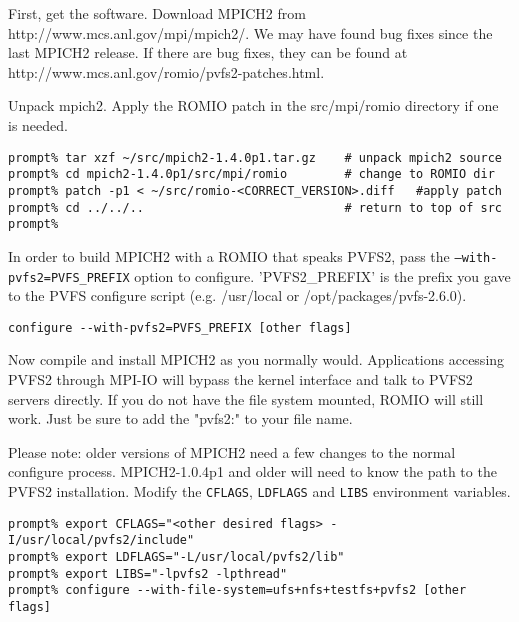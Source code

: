 \documentclass[11pt, letterpaper]{article}
\begin{document}
First, get the software.  Download MPICH2 from
http://www.mcs.anl.gov/mpi/mpich2/.  We may have found bug fixes since the last MPICH2 release.  If there are bug fixes, they can be found at
http://www.mcs.anl.gov/romio/pvfs2-patches.html. 

Unpack mpich2. Apply the ROMIO patch in the src/mpi/romio directory if one is
needed. 

\begin{verbatim}
prompt% tar xzf ~/src/mpich2-1.4.0p1.tar.gz    # unpack mpich2 source
prompt% cd mpich2-1.4.0p1/src/mpi/romio        # change to ROMIO dir
prompt% patch -p1 < ~/src/romio-<CORRECT_VERSION>.diff   #apply patch
prompt% cd ../../..                            # return to top of src
prompt% 
\end{verbatim}

In order to build MPICH2 with a ROMIO that speaks PVFS2, pass the
\texttt{--with-pvfs2=PVFS\_PREFIX} option to configure.  'PVFS2\_PREFIX' is the
prefix you gave to the PVFS configure script (e.g. /usr/local or
/opt/packages/pvfs-2.6.0).  

\begin{verbatim}
configure --with-pvfs2=PVFS_PREFIX [other flags]
\end{verbatim}

Now compile and install MPICH2 as you normally would.  Applications accessing
PVFS2 through MPI-IO will bypass the kernel interface and talk to PVFS2 servers
directly.  If you do not have the file system mounted, ROMIO will still work.  Just be sure to add the "pvfs2:" to your file name. 

Please note: older versions of MPICH2 need a few changes
to the normal configure process.  MPICH2-1.0.4p1 and older will need to
know the path to the PVFS2 installation.  Modify the {\tt CFLAGS},
{\tt LDFLAGS} and {\tt LIBS} environment variables.

\begin{verbatim}
prompt% export CFLAGS="<other desired flags> -I/usr/local/pvfs2/include"
prompt% export LDFLAGS="-L/usr/local/pvfs2/lib"
prompt% export LIBS="-lpvfs2 -lpthread"
prompt% configure --with-file-system=ufs+nfs+testfs+pvfs2 [other flags]
\end{verbatim}
\end{document}
